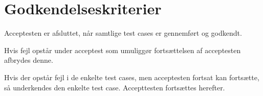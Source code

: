 \section{Godkendelseskriterier}
Acceptesten er afsluttet, når samtlige test cases er gennemført og godkendt.

Hvis fejl opstår under acceptest som umuliggør fortsættelsen af acceptesten afbrydes denne.

Hvis der opstår fejl i de enkelte test cases, men acceptesten fortsat kan fortsætte, så underkendes den enkelte test case. Accepttesten fortsættes herefter.




